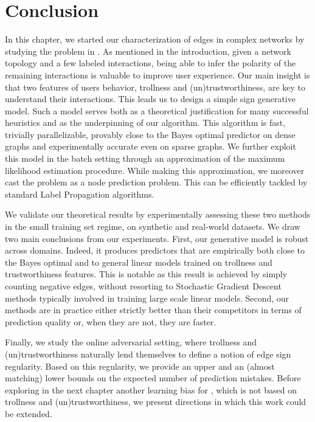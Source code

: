 \section{Conclusion}

\begin{newcontent}
In this chapter, we started our characterization of edges in complex networks by studying the \esp{}
problem in \dssn{}. As mentioned in the introduction, given a network topology and a few labeled
interactions, being able to infer the polarity of the remaining interactions is valuable to improve
user experience. Our main insight is that two features of users behavior, trollness and
(un)trustworthiness, are key to understand their interactions. This leads us to design a simple sign
generative model. Such a model serves both as a theoretical justification for many successful
heuristics and as the underpinning of our \usrule{} algorithm. This algorithm is fast, trivially
parallelizable, provably close to the Bayes optimal predictor on dense graphs and experimentally
accurate even on sparse graphs. We further exploit this model in the batch setting through an
approximation of the maximum likelihood estimation procedure. While making this approximation, we
moreover cast the problem as a node prediction problem. This can be efficiently tackled by standard
Label Propagation algorithms.

We validate our theoretical results by experimentally assessing these two methods in the small
training set regime, on synthetic and real-world datasets. We draw two main conclusions from our
experiments. First, our generative model is robust across domains. Indeed, it produces predictors
that are empirically both close to the Bayes optimal and to general linear models trained on
trollness and trustworthiness features. This is notable as this result is achieved by simply
counting negative edges, without resorting to Stochastic Gradient Descent methods typically involved
in training large scale linear models. Second, our methods are in practice either strictly better
than their competitors in terms of prediction quality or, when they are not, they are faster.

Finally, we study the online adversarial setting, where trollness and (un)trustworthiness naturally
lend themselves to define a notion of edge sign regularity. Based on this regularity, we provide an
upper and an (almost matching) lower bounds on the expected number of prediction mistakes. Before
exploring in the next chapter another learning bias for \esp{}, which is not based on trollness and
(un)trustworthiness, we present directions in which this work could be extended.


\end{newcontent}
